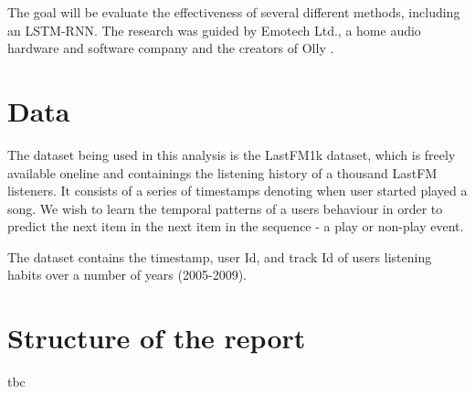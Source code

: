 The goal will be evaluate the effectiveness of several different methods, including an LSTM-RNN. 
The research was guided by Emotech Ltd., a home audio hardware and software company and the creators of Olly \parencite{Olly}.

\section{Data}

The dataset being used in this analysis is the LastFM1k dataset, which is freely available oneline and containings the listening history of a thousand LastFM listeners. It consists of a series of timestamps denoting when user started played a song. We wish to learn the temporal patterns of a users behaviour in order to predict the next item in the next item in the sequence - a play or non-play event. 

The dataset contains the timestamp, user Id, and track Id of users listening habits over a number of years (2005-2009).

\section{Structure of the report}
tbc
